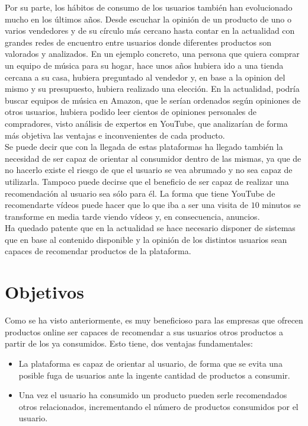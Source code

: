 Por su parte, los hábitos de consumo de los usuarios también han evolucionado mucho en los últimos años. Desde escuchar la opinión de un producto de uno o varios vendedores y de su círculo más cercano hasta contar en la actualidad con grandes redes de encuentro entre usuarios donde diferentes productos son valorados y analizados. En un ejemplo concreto, una persona que quiera comprar un equipo de música para su hogar, hace unos años hubiera ido a una tienda cercana a su casa, hubiera preguntado al vendedor y, en base a la opinion del mismo y su presupuesto, hubiera realizado una elección. En la actualidad, podría buscar equipos de música en Amazon, que le serían ordenados según opiniones de otros usuarios, hubiera podido leer cientos de opiniones personales de compradores, visto análisis de expertos en YouTube, que analizarían de forma más objetiva las ventajas e inconvenientes de cada producto.\\

Se puede decir que con la llegada de estas plataformas ha llegado también la necesidad de ser capaz de orientar al consumidor dentro de las mismas, ya que de no hacerlo existe el riesgo de que el usuario se vea abrumado y no sea capaz de utilizarla. Tampoco puede decirse que el beneficio de ser capaz de realizar una recomendación al usuario sea sólo para él. La forma que tiene YouTube de recomendarte vídeos puede hacer que lo que iba a ser una visita de $10$ minutos se transforme en media tarde viendo vídeos y, en consecuencia, anuncios.\\

Ha quedado patente que en la actualidad se hace necesario disponer de sistemas que en base al contenido disponible y la opinión de los distintos usuarios sean capaces de recomendar productos de la plataforma.


\section{Objetivos}\label{sec:objetivos}

Como se ha visto anteriormente, es muy beneficioso para las empresas que ofrecen productos online ser capaces de recomendar a sus usuarios otros productos a partir de los ya consumidos. Esto tiene, dos ventajas fundamentales:

\begin{itemize}
    \item La plataforma es capaz de orientar al usuario, de forma que se evita una posible fuga de usuarios ante la ingente cantidad de productos a consumir.
    
    \item Una vez el usuario ha consumido un producto pueden serle recomendados otros relacionados, incrementando el número de productos consumidos por el usuario.
\end{itemize}

